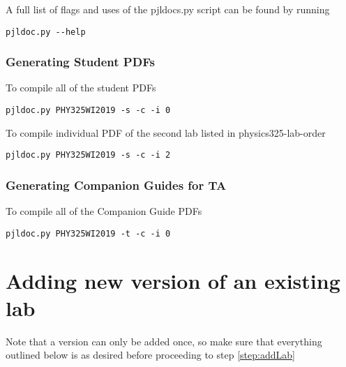 \documentclass[justified]{LabArx1_5}
\begin{document}
A full list of flags and uses of the pjldocs.py script can be found by running 

\begin{lstlisting}
pjldoc.py --help       
\end{lstlisting}


\subsubsection{Generating Student PDFs}

To compile all of the student PDFs

\begin{lstlisting}
pjldoc.py PHY325WI2019 -s -c -i 0        
\end{lstlisting}


To compile individual PDF of the second lab listed in physics325-lab-order

\begin{lstlisting}
pjldoc.py PHY325WI2019 -s -c -i 2
\end{lstlisting}

\subsubsection{Generating Companion Guides for TA}

To compile all of the Companion Guide PDFs

\begin{lstlisting}
pjldoc.py PHY325WI2019 -t -c -i 0        
\end{lstlisting}


\section{Adding new version of an existing lab}

Note that a version can only be added once, so make sure that everything outlined below is as desired before proceeding to step \ref{step:addLab}
\end{document}
